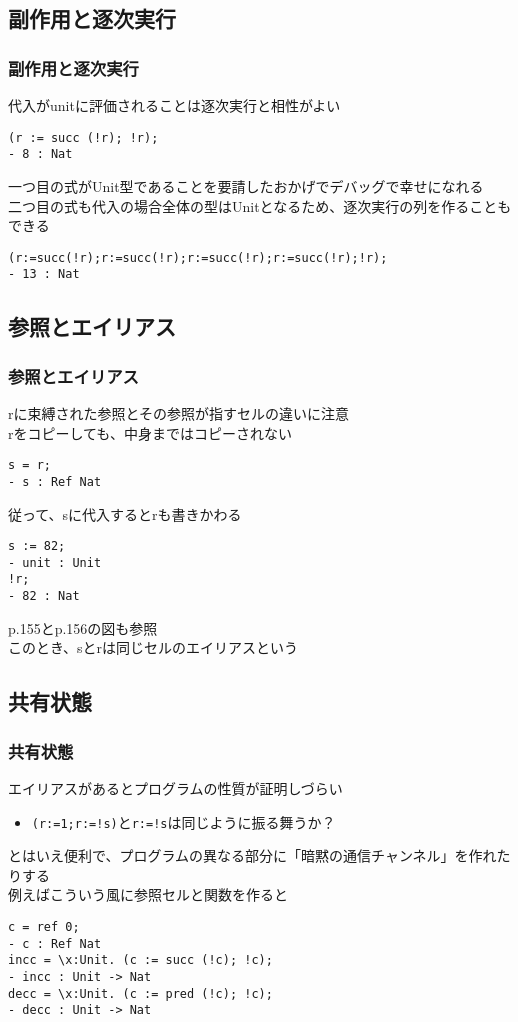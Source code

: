 \documentclass[dvipdfmx,cjk,xcolor=dvipsnames,envcountsect,notheorems]{beamer}
\theoremstyle{definition}
\begin{document}
\subsection{副作用と逐次実行}

\begin{frame}[fragile]
	\frametitle{副作用と逐次実行}
	\Large 代入がunitに評価されることは逐次実行と相性がよい
\begin{lstlisting}
(r := succ (!r); !r);
- 8 : Nat
\end{lstlisting}
	一つ目の式がUnit型であることを要請したおかげでデバッグで幸せになれる\\
	二つ目の式も代入の場合全体の型はUnitとなるため、逐次実行の列を作ることもできる
\begin{lstlisting}
(r:=succ(!r);r:=succ(!r);r:=succ(!r);r:=succ(!r);!r);
- 13 : Nat
\end{lstlisting}
\end{frame}

\subsection{参照とエイリアス}

\begin{frame}[fragile]
	\frametitle{参照とエイリアス}
	\Large rに束縛された参照とその参照が指すセルの違いに注意\\
	rをコピーしても、中身まではコピーされない
\begin{lstlisting}
s = r;
- s : Ref Nat
\end{lstlisting}
	従って、sに代入するとrも書きかわる
\begin{lstlisting}
s := 82;
- unit : Unit
!r;
- 82 : Nat
\end{lstlisting}
	{\small p.155とp.156の図も参照}\\
	このとき、sとrは同じセルのエイリアスという
\end{frame}

\subsection{共有状態}

\begin{frame}[fragile]
	\frametitle{共有状態}
	\Large エイリアスがあるとプログラムの性質が証明しづらい
	\begin{itemize}
		\item \lstinline|(r:=1;r:=!s)|と\lstinline|r:=!s|は同じように振る舞うか？
	\end{itemize}
	とはいえ便利で、プログラムの異なる部分に「暗黙の通信チャンネル」を作れたりする\\
	例えばこういう風に参照セルと関数を作ると
\begin{lstlisting}
c = ref 0;
- c : Ref Nat
incc = \x:Unit. (c := succ (!c); !c);
- incc : Unit -> Nat
decc = \x:Unit. (c := pred (!c); !c);
- decc : Unit -> Nat
\end{lstlisting}
\end{frame}
\end{document}
